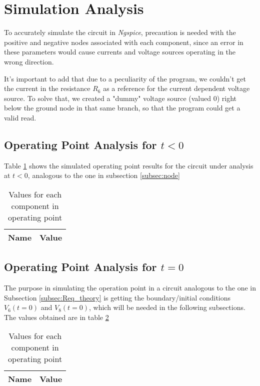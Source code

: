 \section{Simulation Analysis}
\label{sec:simulation}

To accurately simulate the circuit in \textit{Ngspice}, precaution is needed with the positive and negative nodes associated with each component, since an error in these parameters would cause currents and voltage sources operating in the wrong direction.

It's important to add that due to a peculiarity of the program, we couldn't get the current in the resistance $R_6$ as a reference for the current dependent voltage source. To solve that, we created a "dummy" voltage source (valued 0) right below the ground node in that same branch, so that the program could get a valid read.


\subsection{Operating Point Analysis for $t<0$}
\label{subsec:OP_t<0}

Table \ref{tabopS} shows the simulated operating point results for the circuit under analysis at $t<0$, analogous to the one in subsection \ref{subsec:node}

\begin{table}[!ht]
  \centering
  \begin{tabular}{|l|r|}
    \hline    
    {\bf Name} & {\bf Value} \\ \hline
    
  \end{tabular}
  \caption{Values for each component in operating point}
  \label{tabopS}
\end{table}

\newpage

\subsection{Operating Point Analysis for $t=0$}
\label{subsec:OP_t=0}


The purpose in simulating the operation point in a circuit analogous to the one in Subsection \ref{subsec:Req_theory} is getting the boundary/initial conditions $V_6(t=0)$ and $V_8(t=0)$, which will be needed in the following subsections. The values obtained are in table \ref{tabop2S}

\begin{table}[!ht]
  \centering
  \begin{tabular}{|l|r|}
    \hline    
    {\bf Name} & {\bf Value} \\ \hline
    
  \end{tabular}
  \caption{Values for each component in operating point}
  \label{tabop2S}
\end{table}

